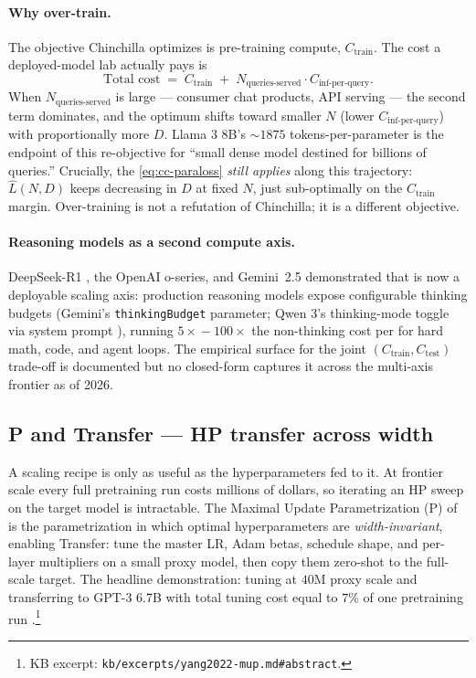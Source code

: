 \paragraph{Why over-train.}
The objective Chinchilla optimizes is pre-training compute,
$C_{\text{train}}$. The cost a deployed-model lab actually pays is
\begin{equation}
\text{Total cost} \;=\; C_{\text{train}} \;+\; N_{\text{queries-served}} \cdot C_{\text{inf-per-query}}.
\label{eq:total-cost}
\end{equation}
When $N_{\text{queries-served}}$ is large --- consumer chat products,
API serving --- the second term dominates, and the optimum shifts
toward smaller $N$ (lower $C_{\text{inf-per-query}}$) with proportionally
more $D$. Llama 3 8B's $\sim 1875$ tokens-per-parameter is the endpoint
of this re-objective for ``small dense model destined for billions of
queries.'' Crucially, the  \cref{eq:cc-paraloss}
\emph{still applies} along this trajectory: $\hat{L}(N, D)$ keeps
decreasing in $D$ at fixed $N$, just sub-optimally on the
$C_{\text{train}}$ margin. Over-training is not a refutation of
Chinchilla; it is a different objective.

\paragraph{Reasoning models as a second compute axis.}
DeepSeek-R1 \citep{deepseek-r1}, the OpenAI o-series, and Gemini~2.5
\citep{gemini2-5} demonstrated that  is now a
deployable scaling axis: production reasoning models expose
configurable thinking budgets (Gemini's \texttt{thinkingBudget}
parameter; Qwen 3's thinking-mode toggle via system prompt
\citep{qwen3}), running $5\!\times\!\!-\!\!100\!\times$ the
non-thinking cost per  for hard math, code, and agent loops. The
empirical surface for the joint $(C_{\text{train}}, C_{\text{test}})$
trade-off is documented but no closed-form  captures it
across the multi-axis frontier as of 2026.

\subsection{\textmu P and \textmu Transfer --- HP transfer across width}
\label{sec:scaling-mup}

A scaling recipe is only as useful as the hyperparameters fed to it.
At frontier scale every full pretraining run costs millions of dollars,
so iterating an HP sweep on the target model is intractable. The
Maximal Update Parametrization (\textmu P) of \citet{yang2022-mup} is
the parametrization in which optimal hyperparameters are
\emph{width-invariant}, enabling \textmu Transfer: tune the master LR,
Adam betas, schedule shape, and per-layer multipliers on a small proxy
model, then copy them zero-shot to the full-scale target. The headline
demonstration: tuning at $40\text{M}$ proxy scale and transferring to
GPT-3 6.7B with total tuning cost equal to $7\%$ of one pretraining
run \citep[abstract]{yang2022-mup}.\footnote{KB excerpt:
\nolinkurl{kb/excerpts/yang2022-mup.md#abstract}.}

